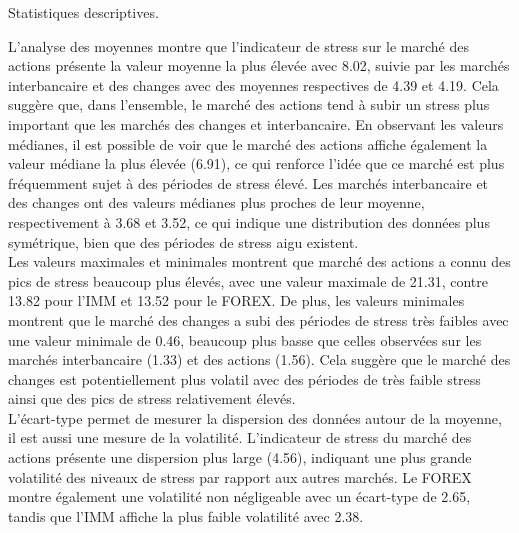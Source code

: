 \begin{sloppypar}
\begin{table}[H]
    \centering
    \sffamily
    \scalebox{0.9}{}
    \caption{Statistiques descriptives.}
    \label{fig:statsdescriptives}
\end{table}

L'analyse des moyennes montre que l'indicateur de stress sur le marché des actions  présente la valeur moyenne la plus élevée avec 8.02, suivie par les marchés interbancaire et des changes avec des moyennes respectives de 4.39 et 4.19. Cela suggère que, dans l'ensemble, le marché des actions tend à subir un stress plus important que les marchés des changes et interbancaire. En observant les valeurs médianes, il est possible de voir que le marché des actions affiche également la valeur médiane la plus élevée (6.91), ce qui renforce l'idée que ce marché est plus fréquemment sujet à des périodes de stress élevé. Les marchés interbancaire et des changes ont des valeurs médianes plus proches de leur moyenne, respectivement à 3.68 et 3.52, ce qui indique une distribution des données plus symétrique, bien que des périodes de stress aigu existent.\\

Les valeurs maximales et minimales montrent que marché des actions a connu des pics de stress beaucoup plus élevés, avec une valeur maximale de 21.31, contre 13.82 pour l'IMM et 13.52 pour le FOREX. De plus, les valeurs minimales montrent que le marché des changes a subi des périodes de stress très faibles avec une valeur minimale de 0.46, beaucoup plus basse que celles observées sur les marchés interbancaire (1.33) et des actions (1.56). Cela suggère que le marché des changes est potentiellement plus volatil avec des périodes de très faible stress ainsi que des pics de stress relativement élevés.\\

L'écart-type permet de mesurer la dispersion des données autour de la moyenne, il est aussi une mesure de la volatilité. L'indicateur de stress du marché des actions présente une dispersion plus large (4.56), indiquant une plus grande volatilité des niveaux de stress par rapport aux autres marchés. Le FOREX montre également une volatilité non négligeable avec un écart-type de 2.65, tandis que l'IMM affiche la plus faible volatilité avec 2.38.\\


\end{sloppypar}
